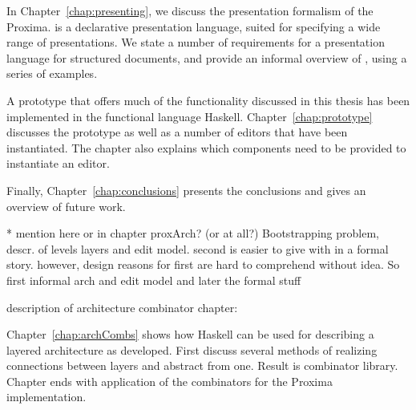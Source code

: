 In Chapter~\ref{chap:presenting}, we discuss the {\Xprez} presentation formalism of the Proxima. {\Xprez} is a declarative presentation language, suited for specifying a wide range of presentations. We state a number of requirements for a presentation language for structured documents, and provide an informal overview of {\Xprez}, using a series of examples.

A prototype that offers much of the functionality discussed in this thesis has been implemented in the functional language Haskell. Chapter~\ref{chap:prototype} discusses the prototype as well as a number of editors that have been instantiated. The chapter also explains which components need to be provided to instantiate an editor.

Finally, Chapter~\ref{chap:conclusions} presents the conclusions and gives an overview of future work.  


\bc
* mention here or in chapter proxArch? (or at all?)
Bootstrapping problem, descr. of levels layers and edit model. second is easier to give with in a formal story. however, design reasons for first are hard to comprehend without idea. So first informal arch and edit model and later the formal stuff


description of architecture combinator chapter:

Chapter~\ref{chap:archCombs} shows how Haskell can be used for describing a layered architecture as developed.
First discuss several methods of realizing connections between layers and abstract from one. Result is combinator library. Chapter ends with application of the combinators for the Proxima implementation.

\ec